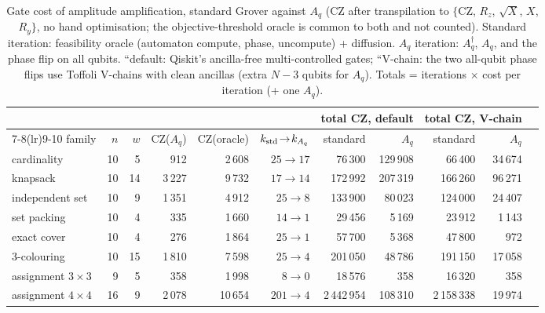 \begin{table}[t]\centering\small\setlength{\tabcolsep}{3.5pt}
\caption{ Gate cost of amplitude amplification, standard Grover against $A_q$ (CZ after transpilation to $\{$CZ, $R_z$, $\sqrt X$, $X$, $R_y\}$, no hand optimisation; the objective-threshold oracle is common to both and not counted). Standard iteration: feasibility oracle (automaton compute, phase, uncompute) + diffusion. $A_q$ iteration: $A_q^\dagger$, $A_q$, and the phase flip on all qubits. ``default: Qiskit's ancilla-free multi-controlled gates; ``V-chain: the two all-qubit phase flips use Toffoli V-chains with clean ancillas (extra $N-3$ qubits for $A_q$). Totals = iterations $\times$ cost per iteration (+ one $A_q$).}\label{tab:gen_cost}
\begin{tabular}{lrrrrrrrrrr}\toprule
& & & & & & \multicolumn{2}{c}{total CZ, default} & \multicolumn{2}{c}{total CZ, V-chain}\\\cmidrule(lr){7-8}\cmidrule(lr){9-10}
family & $n$ & $w$ & CZ($A_q$) & CZ(oracle) & $k_{\rm std}\!\to\!k_{A_q}$ & standard & $A_q$ & standard & $A_q$\\\midrule
cardinality & 10 & 5 & 912 & 2\,608 & $25\to17$ & 76\,300 & 129\,908 & 66\,400 & 34\,674\\
knapsack & 10 & 14 & 3\,227 & 9\,732 & $17\to14$ & 172\,992 & 207\,319 & 166\,260 & 96\,271\\
independent set & 10 & 9 & 1\,351 & 4\,912 & $25\to8$ & 133\,900 & 80\,023 & 124\,000 & 24\,407\\
set packing & 10 & 4 & 335 & 1\,660 & $14\to1$ & 29\,456 & 5\,169 & 23\,912 & 1\,143\\
exact cover & 10 & 4 & 276 & 1\,864 & $25\to1$ & 57\,700 & 5\,368 & 47\,800 & 972\\
3-colouring & 10 & 15 & 1\,810 & 7\,598 & $25\to4$ & 201\,050 & 48\,786 & 191\,150 & 17\,058\\
assignment $3\times3$ & 9 & 5 & 358 & 1\,998 & $8\to0$ & 18\,576 & 358 & 16\,320 & 358\\
assignment $4\times4$ & 16 & 9 & 2\,078 & 10\,654 & $201\to4$ & 2\,442\,954 & 108\,310 & 2\,158\,338 & 19\,974\\
\bottomrule\end{tabular}\end{table}
